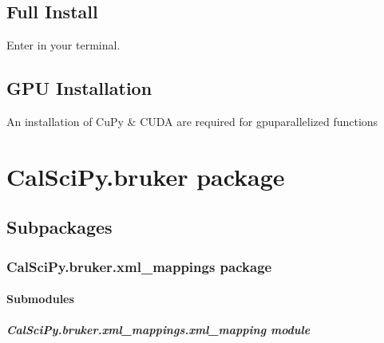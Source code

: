 \documentclass[letterpaper,10pt,english]{sphinxmanual}
\begin{document}
\section{Full Install}
\label{\detokenize{Installation:full-install}}
\sphinxAtStartPar
Enter  in your terminal.


\section{GPU Installation}
\label{\detokenize{Installation:gpu-installation}}
\sphinxAtStartPar
An installation of CuPy \& CUDA are required for gpu\sphinxhyphen{}parallelized functions

\sphinxstepscope


\chapter{CalSciPy.bruker package}
\label{\detokenize{CalSciPy.bruker:calscipy-bruker-package}}\label{\detokenize{CalSciPy.bruker::doc}}

\section{Subpackages}
\label{\detokenize{CalSciPy.bruker:subpackages}}
\sphinxstepscope


\subsection{CalSciPy.bruker.xml\_mappings package}
\label{\detokenize{CalSciPy.bruker.xml_mappings:calscipy-bruker-xml-mappings-package}}\label{\detokenize{CalSciPy.bruker.xml_mappings::doc}}

\subsubsection{Submodules}
\label{\detokenize{CalSciPy.bruker.xml_mappings:submodules}}
\sphinxstepscope


\paragraph{CalSciPy.bruker.xml\_mappings.xml\_mapping module}
\label{\detokenize{CalSciPy.bruker.xml_mappings.xml_mapping:module-CalSciPy.bruker.xml_mappings.xml_mapping}}\label{\detokenize{CalSciPy.bruker.xml_mappings.xml_mapping:calscipy-bruker-xml-mappings-xml-mapping-module}}\label{\detokenize{CalSciPy.bruker.xml_mappings.xml_mapping::doc}}
\end{document}
